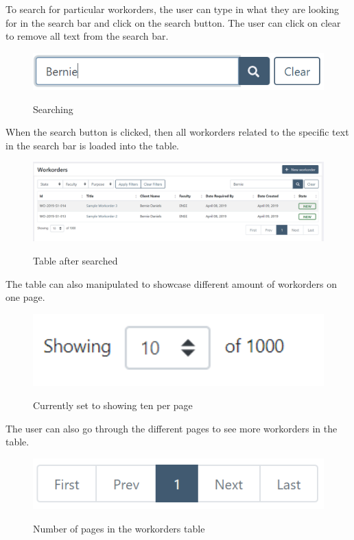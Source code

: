 {{To search for particular workorders, the user can type in what they are looking for in the search bar and click on the search button. The user can click on clear to remove all text from the search bar. 
\begin{figure}[H]
	\centering
	\includegraphics[width=5in]{search.png}\\
	\caption{Searching}
	\label{fig:tobias}
\end{figure}

When the search button is clicked, then all workorders related to the specific text in the search bar is loaded into the table. 
\begin{figure}[H]
	\centering
	\includegraphics[width=5in]{searched-table.png}\\
	\caption{Table after searched}
	\label{fig:tobias}
\end{figure}

The table can also manipulated to showcase different amount of workorders on one page. 
\begin{figure}[H]
	\centering
	\includegraphics[width=5in]{showing.png}\\
	\caption{Currently set to showing ten per page}
	\label{fig:tobias}
\end{figure}

The user can also go through the different pages to see more workorders in the table. 
\begin{figure}[H]
	\centering
	\includegraphics[width=5in]{next.png}\\
	\caption{Number of pages in the workorders table}
	\label{fig:tobias}
\end{figure}

}}
